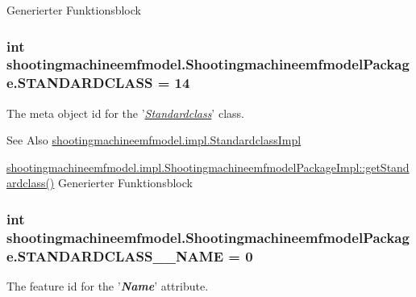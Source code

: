 Generierter Funktionsblock  \hypertarget{interfaceshootingmachineemfmodel_1_1_shootingmachineemfmodel_package_ae1c5b272bef559844d19b2f28cadf5dc}{
\subsubsection[{S\-T\-A\-N\-D\-A\-R\-D\-C\-L\-A\-S\-S}]{\setlength{\rightskip}{0pt plus 5cm}int shootingmachineemfmodel.\-Shootingmachineemfmodel\-Package.\-S\-T\-A\-N\-D\-A\-R\-D\-C\-L\-A\-S\-S = 14}}\label{interfaceshootingmachineemfmodel_1_1_shootingmachineemfmodel_package_ae1c5b272bef559844d19b2f28cadf5dc}
The meta object id for the '\hyperlink{classshootingmachineemfmodel_1_1impl_1_1_standardclass_impl}{{\itshape Standardclass}}' class.

\begin{DoxySeeAlso}{See Also}
\hyperlink{classshootingmachineemfmodel_1_1impl_1_1_standardclass_impl}{shootingmachineemfmodel.\-impl.\-Standardclass\-Impl} 

\hyperlink{classshootingmachineemfmodel_1_1impl_1_1_shootingmachineemfmodel_package_impl_a5fd188e97c85df36a65343bbd588bb31}{shootingmachineemfmodel.\-impl.\-Shootingmachineemfmodel\-Package\-Impl\-::get\-Standardclass()} Generierter Funktionsblock 
\end{DoxySeeAlso}
\hypertarget{interfaceshootingmachineemfmodel_1_1_shootingmachineemfmodel_package_a06475d7d54d52ee19b2aaf4d5d73c738}{
\subsubsection[{S\-T\-A\-N\-D\-A\-R\-D\-C\-L\-A\-S\-S\-\_\-\-\_\-\-N\-A\-M\-E}]{\setlength{\rightskip}{0pt plus 5cm}int shootingmachineemfmodel.\-Shootingmachineemfmodel\-Package.\-S\-T\-A\-N\-D\-A\-R\-D\-C\-L\-A\-S\-S\-\_\-\-\_\-\-N\-A\-M\-E = 0}}\label{interfaceshootingmachineemfmodel_1_1_shootingmachineemfmodel_package_a06475d7d54d52ee19b2aaf4d5d73c738}
The feature id for the '{\itshape {\bfseries Name}}' attribute.

